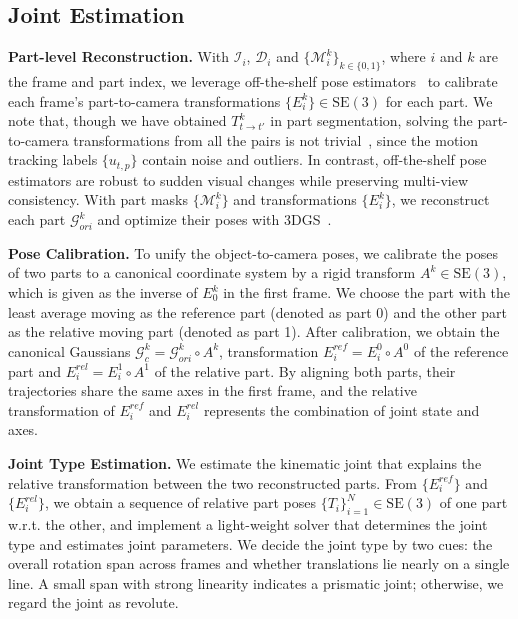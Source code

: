 

\subsection{Joint Estimation}
\label{sec:3.3}
 
\noindent\textbf{Part-level Reconstruction.} With $\mathcal{I}_i$, $\mathcal{D}_i$ and $\{\mathcal{M}_i^k\}_{k\in\{0,1\}}$, where $i$ and $k$ are the frame and part index,
we leverage off-the-shelf pose estimators~\cite{bundlesdf,arun1987least} 
to calibrate each frame's part-to-camera transformations $\{{E}_i^k\}\in \mathrm{SE}(3)$ for each part. We note that, though we have obtained $T^k_{t\to t'}$ in part segmentation, solving the part-to-camera transformations from all the pairs is not trivial~\cite{wang2024dust3r}, since the motion tracking labels $\{u_{t,p}\}$ contain noise and outliers. In contrast, off-the-shelf pose estimators are robust to sudden visual changes while preserving multi-view consistency. With part masks $\{\mathcal{M}_i^k\}$ and transformations $\{{E}_i^k\}$, we reconstruct each part $\mathcal{G}_{ori}^k$ and optimize their poses with 3DGS~\cite{kerbl20233d}.

\noindent\textbf{Pose Calibration.} To unify the object-to-camera poses, we calibrate the poses of two parts to a canonical coordinate system by a rigid transform $A^k \in \mathrm{SE}(3)$, which is given as the inverse of ${E}_0^k$ in the first frame. We choose the part with the least average moving as the reference part (denoted as part 0) and the other part as the relative moving part (denoted as part 1). After calibration, we obtain the canonical Gaussians $\mathcal{G}_c^k = \mathcal{G}_{ori}^k \circ A^k$, transformation $E^{ref}_i = {E}_i^0 \circ {A}^0$ of the reference part and ${E}^{rel}_i = {E}_i^1 \circ {A}^1$ of the relative part. By aligning both parts, their trajectories share the same axes in the first frame, and the relative transformation of ${E}^{ref}_i$ and ${E}^{rel}_i$ represents the combination of joint state and axes.

\noindent\textbf{Joint Type Estimation.} We estimate the kinematic joint that explains the relative transformation between the two reconstructed parts. From $\{{E}^{ref}_i\}$ and $\{{E}^{rel}_i\}$, we obtain a sequence of relative part poses $\{{T}_i\}_{i=1}^N\in\mathrm{SE}(3)$ of one part w.r.t. the other, and implement a light-weight solver that determines the joint type and estimates joint parameters. We decide the joint type by two cues: the overall rotation span across frames and whether translations lie nearly on a single line. A small span with strong linearity indicates a prismatic joint; otherwise, we regard the joint as revolute.


